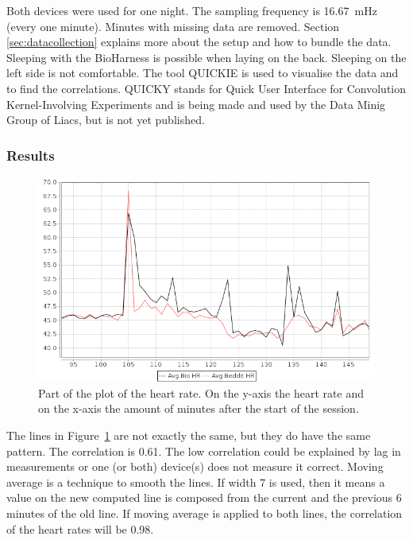 			Both devices were used for one night. The sampling frequency is \SI{16.67}{\milli\hertz} (every one minute). Minutes with missing data are removed. Section \ref{sec:datacollection} explains more about the setup and how to bundle the data. Sleeping with the BioHarness is possible when laying on the back. Sleeping on the left side is not comfortable. The tool QUICKIE is used to visualise the data and to find the correlations. QUICKY stands for Quick User Interface for Convolution Kernel-Involving Experiments and is being made and used by the Data Minig Group of Liacs, but is not yet published.

		\subsubsection{Results}
			
			\begin{figure}[h]
				\centering
					\includegraphics[scale=0.5]{avgbiovsavgbeddit.png}
					\caption{Part of the plot of the heart rate. On the y-axis the heart rate and on the x-axis the amount of minutes after the start of the session.}
				\label{fig:avgbiovsavgbeddit}

			\end{figure}

			The lines in Figure~\ref{fig:avgbiovsavgbeddit} are not exactly the same, but they do have the same pattern. The correlation is 0.61. The low correlation could be explained by lag in measurements or one (or both) device(s) does not measure it correct. Moving average is a technique to smooth the lines. If width 7 is used, then it means a value on the new computed line is composed from the current and the previous 6 minutes of the old line. If moving average is applied to both lines, the correlation of the heart rates will be 0.98.\
						

